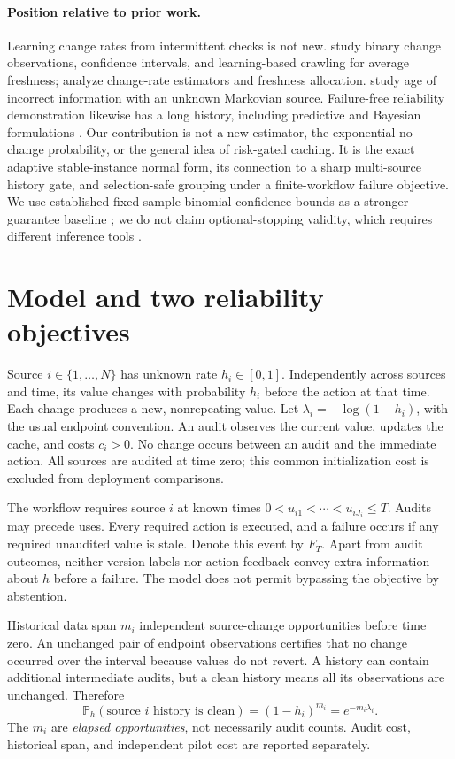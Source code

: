 \documentclass{article}
\newcommand{\Pp}{\mathbb P}
\newcommand{\1}{\mathbf 1}
\begin{document}
\paragraph{Position relative to prior work.}
Learning change rates from intermittent checks is not new. \citet{upadhyay2019} study binary change observations, confidence intervals, and learning-based crawling for average freshness; \citet{avrachenkov2020} analyze change-rate estimators and freshness allocation. \citet{kriouile2022} study age of incorrect information with an unknown Markovian source. Failure-free reliability demonstration likewise has a long history, including predictive and Bayesian formulations \citep{coolen2005,wilson2019}. Our contribution is not a new estimator, the exponential no-change probability, or the general idea of risk-gated caching. It is the exact adaptive stable-instance normal form, its connection to a sharp multi-source history gate, and selection-safe grouping under a finite-workflow failure objective. We use established fixed-sample binomial confidence bounds as a stronger-guarantee baseline \citep{clopper1934}; we do not claim optional-stopping validity, which requires different inference tools \citep{howard2021}.

\section{Model and two reliability objectives}\label{sec:model}
Source $i\in\{1,\ldots,N\}$ has unknown rate $h_i\in[0,1]$. Independently across sources and time, its value changes with probability $h_i$ before the action at that time. Each change produces a new, nonrepeating value. Let $\lambda_i=-\log(1-h_i)$, with the usual endpoint convention. An audit observes the current value, updates the cache, and costs $c_i>0$. No change occurs between an audit and the immediate action. All sources are audited at time zero; this common initialization cost is excluded from deployment comparisons.

The workflow requires source $i$ at known times $0<u_{i1}<\cdots<u_{iJ_i}\leq T$. Audits may precede uses. Every required action is executed, and a failure occurs if any required unaudited value is stale. Denote this event by $F_T$. Apart from audit outcomes, neither version labels nor action feedback convey extra information about $h$ before a failure. The model does not permit bypassing the objective by abstention.

Historical data span $m_i$ independent source-change opportunities before time zero. An unchanged pair of endpoint observations certifies that no change occurred over the interval because values do not revert. A history can contain additional intermediate audits, but a clean history means all its observations are unchanged. Therefore
\begin{equation}
\Pp_h(\text{source $i$ history is clean})=(1-h_i)^{m_i}=e^{-m_i\lambda_i}.\label{eq:clean}
\end{equation}
The $m_i$ are \emph{elapsed opportunities}, not necessarily audit counts. Audit cost, historical span, and independent pilot cost are reported separately.
\end{document}
